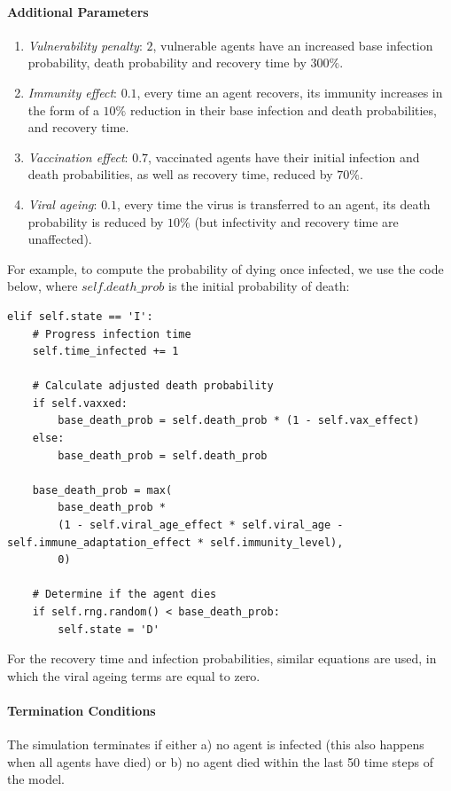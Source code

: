 \documentclass[a4paper,12pt]{article}
\begin{document}
\paragraph{Additional Parameters}
\begin{enumerate}
\item \textit{Vulnerability penalty}: $2$, vulnerable agents have an increased base infection probability, death probability and recovery time by $300\%$.
\item \textit{Immunity effect}: $0.1$, every time an agent recovers, its immunity increases in the form of a $10\%$ reduction in their base infection and death probabilities, and recovery time.
\item \textit{Vaccination effect}: $0.7$, vaccinated agents have their initial infection and death probabilities, as well as recovery time, reduced by $70\%$.
\item \textit{Viral ageing}: $0.1$, every time the virus is transferred to an agent, its death probability is reduced by $10\%$ (but infectivity and recovery time are unaffected).
\end{enumerate}

\strut
For example, to compute the probability of dying once infected, we use the code below, where $self.death\_prob$ is the initial probability of death:

\begin{lstlisting}
elif self.state == 'I':
    # Progress infection time
    self.time_infected += 1
    
    # Calculate adjusted death probability
    if self.vaxxed:
        base_death_prob = self.death_prob * (1 - self.vax_effect)
    else:
        base_death_prob = self.death_prob
    
    base_death_prob = max(
        base_death_prob *
        (1 - self.viral_age_effect * self.viral_age - self.immune_adaptation_effect * self.immunity_level),
        0)
    
    # Determine if the agent dies
    if self.rng.random() < base_death_prob:
        self.state = 'D'
\end{lstlisting}
For the recovery time and infection probabilities, similar equations are used, in which the viral ageing terms are equal to zero.

\paragraph{Termination Conditions} The simulation terminates if either a) no agent is infected (this also happens when all agents have died) or b) no agent died within the last 50 time steps of the model. 
\end{document}

